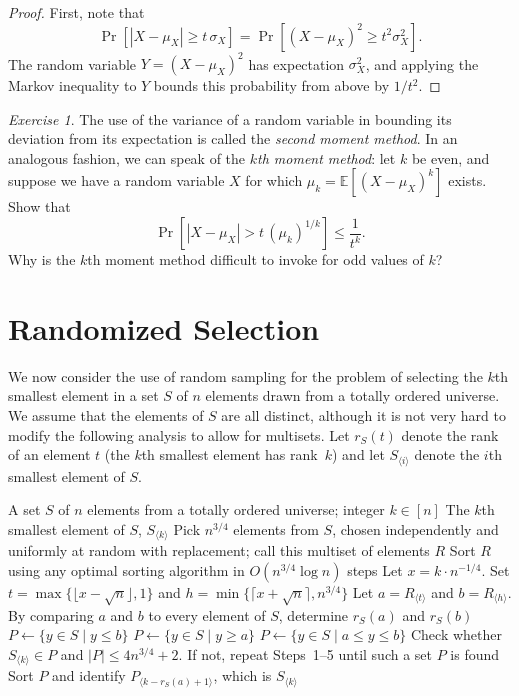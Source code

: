 \documentclass[twoside,12pt]{book}
\theoremstyle{plain}
\theoremstyle{definition}
\theoremstyle{remark}
\newtheorem{exercise}[theorem]{Exercise}
\begin{document}
\begin{proof}
First, note that
\[
\Pr[|X - \mu_X| \geq t\,\sigma_X] = \Pr[(X - \mu_X)^2 \geq t^2 \sigma_X^2].
\]
The random variable $Y = (X - \mu_X)^2$ has expectation $\sigma_X^2$, and applying the Markov inequality to $Y$ bounds this probability from above by $1/t^2$.
\end{proof}

\begin{exercise}
The use of the variance of a random variable in bounding its deviation from its expectation is called the \emph{second moment method}. In an analogous fashion, we can speak of the \emph{$k$th moment method}: let $k$ be even, and suppose we have a random variable $X$ for which $\mu_k = \mathbb{E}[(X - \mu_X)^k]$ exists. Show that
\[
\Pr[|X - \mu_X| > t\,(\mu_k)^{1/k}] \leq \frac{1}{t^k}.
\]
Why is the $k$th moment method difficult to invoke for odd values of $k$?
\end{exercise}

\section{Randomized Selection}
\label{sec:rand-sel}

We now consider the use of random sampling for the problem of selecting the $k$th smallest element in a set $S$ of $n$ elements drawn from a totally ordered universe. We assume that the elements of $S$ are all distinct, although it is not very hard to modify the following analysis to allow for multisets. Let $r_S(t)$ denote the rank of an element $t$ (the $k$th smallest element has rank~$k$) and let $S_{\langle i \rangle}$ denote the $i$th smallest element of $S$.

\begin{algorithm}[H]
\caption{LazySelect}
\label{alg:lazy-select}
\begin{algorithmic}[1]
\Require A set $S$ of $n$ elements from a totally ordered universe; integer $k \in [n]$
\Ensure The $k$th smallest element of $S$, $S_{\langle k \rangle}$
\State Pick $n^{3/4}$ elements from $S$, chosen independently and uniformly at random with replacement; call this multiset of elements $R$
\State Sort $R$ using any optimal sorting algorithm in $O(n^{3/4} \log n)$ steps
\State Let $x = k \cdot n^{-1/4}$. Set $t = \max\{\lfloor x - \sqrt{n} \rfloor, 1\}$ and $h = \min\{\lceil x + \sqrt{n} \rceil, n^{3/4}\}$
\State Let $a = R_{\langle t \rangle}$ and $b = R_{\langle h \rangle}$. By comparing $a$ and $b$ to every element of $S$, determine $r_S(a)$ and $r_S(b)$
    \State $P \gets \{y \in S \mid y \leq b\}$
    \State $P \gets \{y \in S \mid y \geq a\}$
\Else
    \State $P \gets \{y \in S \mid a \leq y \leq b\}$
\EndIf
\State Check whether $S_{\langle k \rangle} \in P$ and $|P| \leq 4n^{3/4} + 2$. If not, repeat Steps~1--5 until such a set $P$ is found
\State Sort $P$ and identify $P_{\langle k - r_S(a) + 1 \rangle}$, which is $S_{\langle k \rangle}$
\end{algorithmic}
\end{algorithm}
\end{document}

